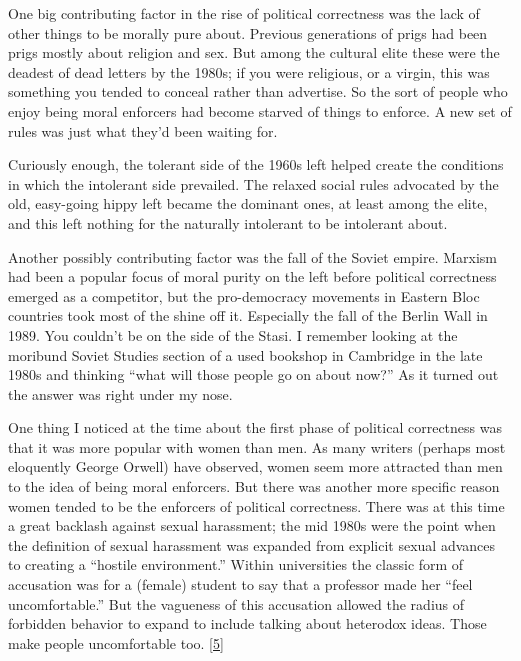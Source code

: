 One big contributing factor in the rise of political correctness was the
lack of other things to be morally pure about. Previous generations of
prigs had been prigs mostly about religion and sex. But among the
cultural elite these were the deadest of dead letters by the 1980s; if
you were religious, or a virgin, this was something you tended to
conceal rather than advertise. So the sort of people who enjoy being
moral enforcers had become starved of things to enforce. A new set of
rules was just what they'd been waiting for.

Curiously enough, the tolerant side of the 1960s left helped create the
conditions in which the intolerant side prevailed. The relaxed social
rules advocated by the old, easy-going hippy left became the dominant
ones, at least among the elite, and this left nothing for the naturally
intolerant to be intolerant about.

Another possibly contributing factor was the fall of the Soviet empire.
Marxism had been a popular focus of moral purity on the left before
political correctness emerged as a competitor, but the pro-democracy
movements in Eastern Bloc countries took most of the shine off it.
Especially the fall of the Berlin Wall in 1989. You couldn't be on the
side of the Stasi. I remember looking at the moribund Soviet Studies
section of a used bookshop in Cambridge in the late 1980s and thinking
``what will those people go on about now?'' As it turned out the answer
was right under my nose.

One thing I noticed at the time about the first phase of political
correctness was that it was more popular with women than men. As many
writers (perhaps most eloquently George Orwell) have observed, women
seem more attracted than men to the idea of being moral enforcers. But
there was another more specific reason women tended to be the enforcers
of political correctness. There was at this time a great backlash
against sexual harassment; the mid 1980s were the point when the
definition of sexual harassment was expanded from explicit sexual
advances to creating a ``hostile environment.'' Within universities the
classic form of accusation was for a (female) student to say that a
professor made her ``feel uncomfortable.'' But the vagueness of this
accusation allowed the radius of forbidden behavior to expand to include
talking about heterodox ideas. Those make people uncomfortable too.
{[}\hyperref[f5n]{5}{]}

